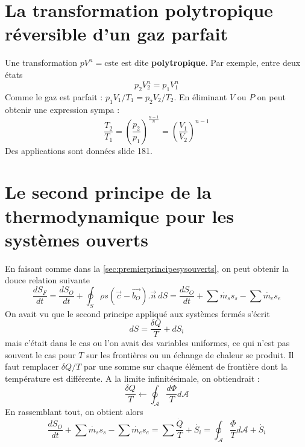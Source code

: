 	\section{La transformation polytropique réversible d’un gaz parfait}
	Une transformation $pV^n = \text{cste}$ est dite \textbf{polytropique}. Par 
	exemple, entre deux états 
	\begin{equation}
	p_2V_2^n = p_1V_1^n
	\end{equation}
	Comme le gaz est parfait : $p_1V_1/T_1=p_2V_2/T_2$. En éliminant $V$ ou $P$ 
	on peut obtenir une expression sympa :
	\begin{equation}
	\dfrac{T_2}{T_1}=\left(\dfrac{p_2}{p_1}\right)^{\frac{n-1}{n}} = \left(\dfrac{
	V_1}{V_2}\right)^{n-1}
	\end{equation}
	Des applications sont données slide 181.
	
	
	\section{Le second principe de la thermodynamique pour les systèmes ouverts}
	En faisant comme dans la \autoref{sec:premierprincipesysouverts}, on peut obtenir la douce relation suivante 
	\begin{equation}
	\dfrac{dS_F}{dt} = \dfrac{dS_O}{dt} + \oint_S\rho s(\vec{c}-\vec{b_O}).\vec{n}\ 
	dS = \dfrac{dS_O}{dt} + \sum \dot{m_s}s_s - \sum \dot{m_e}s_e
	\end{equation}
	On avait vu que le second principe appliqué aux systèmes fermés s'écrit 
	\begin{equation}
	dS = \dfrac{\delta Q}{T}+dS_i
	\end{equation}
	mais c'était dans le cas ou l'on avait des variables uniformes, ce qui n'est 
	pas souvent le cas pour $T$ sur les frontières ou un échange de chaleur se produit. 
	Il faut remplacer $\delta Q/T$ par une somme sur chaque élément de frontière dont 
	la température est différente. A la limite infinitésimale, on obtiendrait : 
	\begin{equation}
	\dfrac{\delta Q}{T} \leftarrow \oint_{\mathcal{A}} \dfrac{d\Phi}{T}d\mathcal{A}
	\end{equation}
	En rassemblant tout, on obtient alors
	\begin{equation}
	\dfrac{dS_O}{dt} +\sum\dot{m_s}s_s - \sum \dot{m_e}s_e = \sum \dfrac{\dot{Q}}{T}
	+\dot{S_i} = \oint_{\mathcal{A}}\dfrac{\Phi}{T}d\mathcal{A}+\dot{S_i}
	\end{equation}
	
